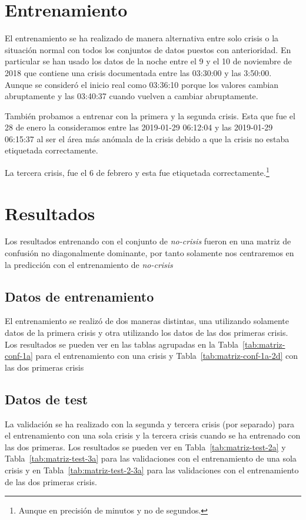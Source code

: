 \documentclass[a4paper,12pt,twoside,oldfontcommands]{memoir}
\begin{document}
\section{Entrenamiento}
El entrenamiento se ha realizado de manera alternativa entre solo crisis o la situación normal con todos los conjuntos de datos puestos con anterioridad. En particular se han usado los datos de la noche entre el 9 y el 10 de noviembre de 2018 que contiene una crisis documentada entre las 03:30:00 y las 3:50:00. Aunque se consideró el inicio real como 03:36:10 porque los valores cambian abruptamente y las 03:40:37 cuando vuelven a cambiar abruptamente. 

También probamos a entrenar con la primera y la segunda crisis. Esta que fue el 28 de enero la consideramos entre las 2019-01-29 06:12:04 y las 2019-01-29 06:15:37 al ser el área más anómala de la crisis debido a que la crisis no estaba etiquetada correctamente.

La tercera crisis, fue el 6 de febrero y esta fue etiquetada correctamente.\footnote{Aunque en precisión de minutos y no de segundos.}

\section{Resultados}
Los resultados entrenando con el conjunto de \textit{no-crisis} fueron en una matriz de confusión no diagonalmente dominante, por tanto solamente nos centraremos en la predicción con el entrenamiento de \textit{no-crisis}
\subsection{Datos de entrenamiento}
El entrenamiento se realizó de dos maneras distintas, una utilizando solamente datos de la primera crisis y otra utilizando los datos de las dos primeras crisis. Los resultados se pueden ver en las tablas agrupadas en la Tabla~\ref{tab:matriz-conf-1a} para el entrenamiento con una crisis y Tabla~\ref{tab:matriz-conf-1a-2d} con las dos primeras crisis


\subsection{Datos de test}
La validación se ha realizado con la segunda y tercera crisis (por separado) para el entrenamiento con una sola crisis y la tercera crisis cuando se ha entrenado con las dos primeras. Los resultados se pueden ver en Tabla~\ref{tab:matriz-test-2a} y Tabla~\ref{tab:matriz-test-3a} para las validaciones con el entrenamiento de una sola crisis y en Tabla~\ref{tab:matriz-test-2-3a} para las validaciones con el entrenamiento de las dos primeras crisis.

\end{document}
